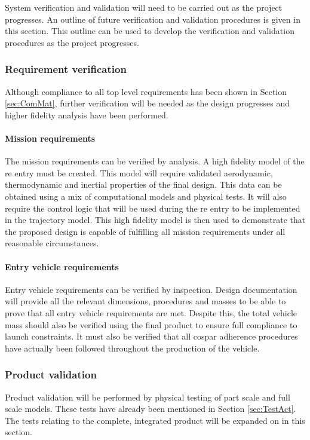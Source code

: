 System verification and validation will need to be carried out as the project progresses. An outline of future verification and validation procedures is given in this section. This outline can be used to develop the verification and validation procedures as the project progresses. 

\subsubsection{Requirement verification}
\label{sec:ReqVer}
Although compliance to all top level requirements has been shown in Section \ref{sec:ComMat}, further verification will be needed as the design progresses and higher fidelity analysis have been performed. 

\paragraph{Mission requirements}
The mission requirements can be verified by analysis. A high fidelity model of the re entry must be created. This model will require validated aerodynamic, thermodynamic and inertial properties of the final design. This data can be obtained using a mix of computational models and physical tests. It will also require the control logic that will be used during the re entry to be implemented in the trajectory model. This high fidelity model is then used to demonstrate that the proposed design is capable of fulfilling all mission requirements under all reasonable circumstances. 

\paragraph{Entry vehicle requirements}
Entry vehicle requirements can be verified by inspection. Design documentation will provide all the relevant dimensions, procedures and masses to be able to prove that all entry vehicle requirements are met. Despite this, the total vehicle mass should also be verified using the final product to ensure full compliance to launch constraints. It must also be verified that all \gls{cospar} adherence procedures have actually been followed throughout the production of the vehicle. 

\subsubsection{Product validation}
Product validation will be performed by physical testing of part scale and full scale models. These tests have already been mentioned in Section \ref{sec:TestAct}. The tests relating to the complete, integrated product will be expanded on in this section.  

